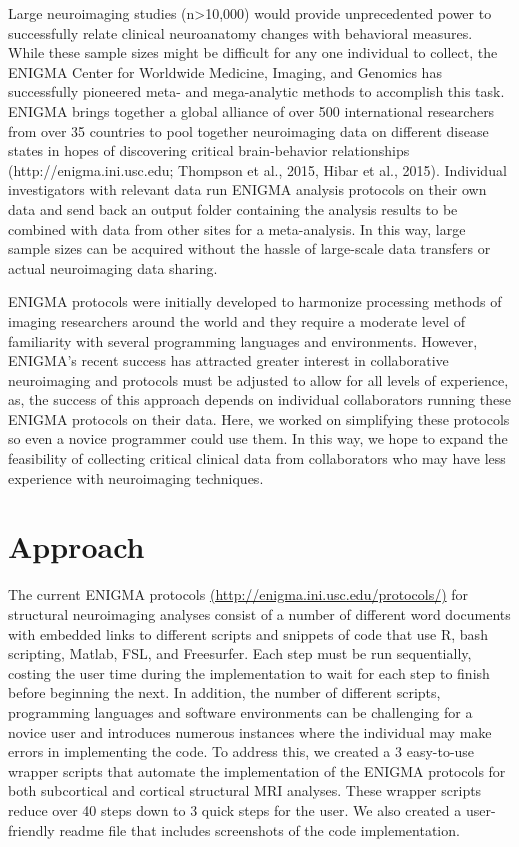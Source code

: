 \documentclass[twocolumn]{bmcart}%
\begin{document}
Large neuroimaging studies (n\textgreater{}10,000) would provide
unprecedented power to successfully relate clinical neuroanatomy changes
with behavioral measures. While these sample sizes might be difficult
for any one individual to collect, the ENIGMA Center for Worldwide
Medicine, Imaging, and Genomics has successfully pioneered meta- and
mega-analytic methods to accomplish this task. ENIGMA brings together a
global alliance of over 500 international researchers from over 35
countries to pool together neuroimaging data on different disease states
in hopes of discovering critical brain-behavior relationships
(http://enigma.ini.usc.edu; Thompson et al., 2015, Hibar et al., 2015). Individual
investigators with relevant data run ENIGMA analysis protocols on their
own data and send back an output folder containing the analysis results
to be combined with data from other sites for a meta-analysis. In this
way, large sample sizes can be acquired without the hassle of
large-scale data transfers or actual neuroimaging data sharing.

ENIGMA protocols were initially developed to harmonize processing
methods of imaging researchers around the world and they require a
moderate level of familiarity with several programming languages and
environments. However, ENIGMA's recent success has attracted greater
interest in collaborative neuroimaging and protocols must be adjusted to
allow for all levels of experience, as, the success of this approach
depends on individual collaborators running these ENIGMA protocols on
their data. Here, we worked on simplifying these protocols so even a
novice programmer could use them. In this way, we hope to expand the
feasibility of collecting critical clinical data from collaborators who
may have less experience with neuroimaging techniques.

\section{Approach}\label{approach}

The current ENIGMA protocols \url{(http://enigma.ini.usc.edu/protocols/)} for
structural neuroimaging analyses consist of a number of different word
documents with embedded links to different scripts and snippets of code
that use R, bash scripting, Matlab, FSL, and Freesurfer. Each step must
be run sequentially, costing the user time during the implementation to
wait for each step to finish before beginning the next. In addition, the
number of different scripts, programming languages and software
environments can be challenging for a novice user and introduces
numerous instances where the individual may make errors in implementing
the code. To address this, we created a 3 easy-to-use wrapper scripts
that automate the implementation of the ENIGMA protocols for both
subcortical and cortical structural MRI analyses. These wrapper scripts
reduce over 40 steps down to 3 quick steps for the user. We also created
a user-friendly readme file that includes screenshots of the code
implementation.
\end{document}
